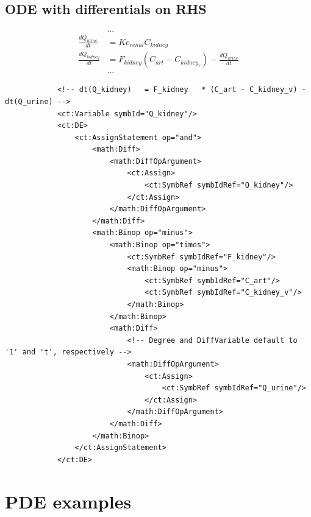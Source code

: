 \subsection{ODE with differentials on RHS}

\begin{align}
& ... \nonumber \\
\frac{dQ_{urine}}{dt}     &= Ke_{renal}   C_{kidney} \nonumber \\
\frac{dQ_{kidney}}{dt}   &= F_{kidney} (C_{art} - C_{kidney_v}) - \frac{dQ_{urine}}{dt} \nonumber \\
& ... \nonumber 
\end{align}

\lstset{language=XML}
\begin{lstlisting}            
            <!-- dt(Q_kidney)   = F_kidney   * (C_art - C_kidney_v) - dt(Q_urine) -->
            <ct:Variable symbId="Q_kidney"/>
            <ct:DE>
                <ct:AssignStatement op="and">
                    <math:Diff>
                        <math:DiffOpArgument>
                            <ct:Assign>
                                <ct:SymbRef symbIdRef="Q_kidney"/>
                            </ct:Assign>
                        </math:DiffOpArgument>
                    </math:Diff>
                    <math:Binop op="minus">
                        <math:Binop op="times">
                            <ct:SymbRef symbIdRef="F_kidney"/>
                            <math:Binop op="minus">
                                <ct:SymbRef symbIdRef="C_art"/>
                                <ct:SymbRef symbIdRef="C_kidney_v"/>
                            </math:Binop>
                        </math:Binop>
                        <math:Diff>
                            <!-- Degree and DiffVariable default to '1' and 't', respectively -->
                            <math:DiffOpArgument>
                                <ct:Assign>
                                    <ct:SymbRef symbIdRef="Q_urine"/>
                                </ct:Assign>
                            </math:DiffOpArgument>
                        </math:Diff>
                    </math:Binop>                    
                </ct:AssignStatement>
            </ct:DE> 
\end{lstlisting}


\section{PDE examples}


